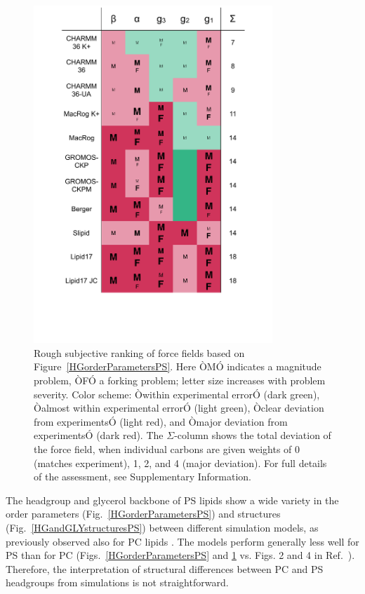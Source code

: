 \documentclass[aps,prl,superscriptaddress,twocolumn]{revtex4}
\begin{document}
\begin{figure}[]
  \centering
  \includegraphics[width=9.0cm]{../Figs/comparisonTablePS.pdf}
  \caption{\label{comparisonTablePS}
    Rough subjective ranking of force fields based on Figure~\ref{HGorderParametersPS}.
    Here ÒMÓ indicates a magnitude problem, ÒFÓ a forking problem; letter size increases with problem severity. Color scheme: Òwithin experimental errorÓ (dark green), Òalmost within experimental errorÓ (light green), Òclear deviation from experimentsÓ (light red), and Òmajor deviation from experimentsÓ (dark red). The $\Sigma$-column shows the total deviation of the force field, when individual carbons are given weights of 0 (matches experiment), 1, 2, and 4 (major deviation). For full details of the assessment, see Supplementary Information.
  }
\end{figure}

The headgroup and glycerol backbone of PS lipids show a wide variety in the order parameters (Fig.~\ref{HGorderParametersPS})
and structures (Fig.~\ref{HGandGLYstructuresPS}) between different simulation models,
as previously observed also for PC lipids \cite{botan15}.
The models perform generally less well for PS than for PC
(Figs.~\ref{HGorderParametersPS} and \ref{comparisonTablePS} vs. Figs. 2 and 4 in Ref.~\cite{botan15}).
Therefore, the interpretation of structural differences between PC and PS headgroups
from simulations is not straightforward.
\end{document}
